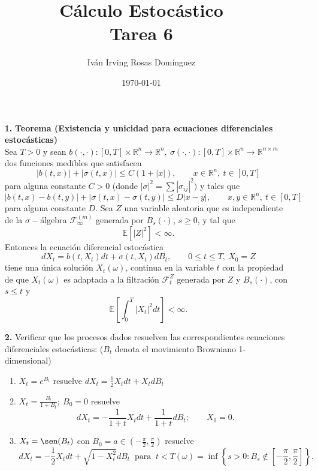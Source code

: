 \documentclass[letterpaper]{article}
\title{\textbf{Cálculo Estocástico\\
Tarea 6}}
\author{Iván Irving Rosas Domínguez}
\date{\today}
\newcommand{\R}{\mathbb{R}}
\newcommand{\F}{\mathcal{F}}
\renewcommand{\to}{\rightarrow}
\newcommand{\E}{\mathbb{E}}
\newcommand{\1}{\mathds{1}}
\theoremstyle{definition}
\theoremstyle{definition}
\theoremstyle{definition}
\theoremstyle{definition}
\theoremstyle{definition}
\begin{document}
\maketitle


\begin{enumerate}
    \item[\textbf{1.}] \textbf{Teorema (Existencia y unicidad para ecuaciones diferenciales estocásticas)}\\
    
    Sea $T>0$ y sean $b(\cdot, \cdot):[0,T]\times \R^{n}\to \R^{n}, \ \sigma(\cdot, \cdot):[0,T]\times \R^{n}\to \R^{n\times m}$ dos
    funciones medibles que satisfacen 
    \[
    |b(t,x)|+|\sigma(t,x)|\leq C(1+|x|), \qquad x\in \R^{n}, \  t\in [0,T]    
    \]
    para alguna constante $C>0$ (donde $|\sigma|^2=\sum|\sigma_{ij}|^2)$ y tales que 
    \[
    |b(t,x)-b(t,y)|+|\sigma(t,x)-\sigma(t,y)|\leq D|x-y|, \qquad x,y \in \R^{n}, \ t\in[0,T]    
    \]
    para alguna constante $D$. Sea $Z$ una variable aleatoria que es independiente de la $\sigma-$álgebra 
    $\F_\infty^{(m)}$ generada por $B_s(\cdot)$, $s\geq0$, y tal que 
    \[
        \E\left[|Z|^{2}\right]<\infty.
    \]
    Entonces la ecuación diferencial estocástica 
    \[
    dX_t=b(t,X_t)dt+\sigma(t,X_t)dB_t, \qquad 0\leq t\leq T, \ X_0=Z
    \]
    tiene una única solución $X_t(\omega)$, continua en la variable $t$ con la propiedad
    de que $X_t(\omega)$ es adaptada a la filtración $\F_t^{Z}$ generada por $Z$ y 
    $B_s(\cdot)$, con $s\leq t$ y 
    \[
    \E\left[\int_{0}^{T}|X_t|^{2}dt\right]<\infty.
    \]
    \item[\textbf{2.}] Verificar que los procesos dados resuelven las correspondientes ecuaciones diferenciales estocásticas:
     ($B_t$ denota el movimiento Browniano 1-dimensional)
     \begin{enumerate}
        \item $X_t=e^{B_t}$ resuelve $dX_t=\frac{1}{2}X_tdt+X_tdB_t$
        \item $X_t=\frac{B_t}{1+B_t}; \ B_0=0$ resuelve 
        \[
        dX_t=-\frac{1}{1+t}X_tdt+\frac{1}{1+t}dB_t; \qquad X_0=0.    
        \]
        \item $X_t=\sen(B_t)$ con $B_0=a \in \left(-\frac{\pi}{2},\frac{\pi}{2}\right)$ resuelve
        \[
            dX_t=-\frac{1}{2}X_t dt + \sqrt{1-X_t^2}dB_t \ \text{ para } \ t<T(\omega)=\inf \left\{s>0 : B_s \not \in \left[-\frac{\pi}{2},\frac{\pi}{2}\right]\right\}.
\]
\end{enumerate}
\end{enumerate}
\end{document}
